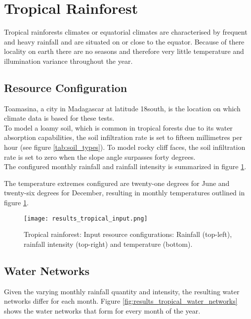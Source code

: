 \section{Tropical Rainforest}

Tropical rainforests climates or equatorial climates are characterised by frequent and heavy rainfall and are situated on or close to the equator. Because of there locality on earth there are no seasons and therefore very little temperature and illumination variance throughout the year.\\

\subsection{Resource Configuration}

Toamasina, a city in Madagascar at latitude 18\textdegree south, is the location on which climate data is based for these tests.\\

To model a loamy soil, which is common in tropical forests due to its water absorption capabilities, the soil infiltration rate is set to fifteen millimetres per hour (see figure \ref{tab:soil_types}). To model rocky cliff faces, the soil infiltration rate is set to zero when the slope angle surpasses forty degrees.\\

The configured monthly rainfall and rainfall intensity is summarized in figure \ref{fig:results_tropical_input}.

The temperature extremes configured are twenty-one degrees for June and twenty-six degrees for December, resulting in monthly temperatures outlined in figure \ref{fig:results_tropical_input}.

\begin{figure}
\center
	\texttt{[image: results\_tropical\_input.png]}
	\caption{ Tropical rainforest: Input resource configurations: Rainfall (top-left), rainfall intensity (top-right) and temperature (bottom).}
	\label{fig:results_tropical_input}
\end{figure}

\subsection{Water Networks}

Given the varying monthly rainfall quantity and intensity, the resulting water networks differ for each month. Figure \ref{fig:results_tropical_water_networks} shows the water networks that form for every month of the year.

